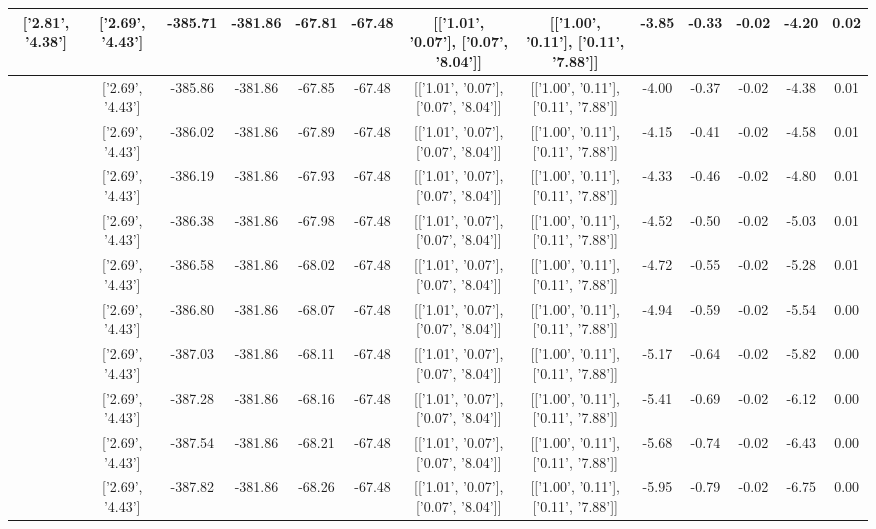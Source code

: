 \begin{table}[htbp]
\begin{adjustbox}{angle=90}
\begin{tabular}{|c|c|c|c|c|c|c|c|c|c|c|c|c|}
 ['2.81', '4.38'] & ['2.69', '4.43'] & -385.71 & -381.86 & -67.81 & -67.48 & [['1.01', '0.07'], ['0.07', '8.04']] & [['1.00', '0.11'], ['0.11', '7.88']] & -3.85 & -0.33 & -0.02 & -4.20 & 0.02\\ \hline
 ['2.82', '4.37'] & ['2.69', '4.43'] & -385.86 & -381.86 & -67.85 & -67.48 & [['1.01', '0.07'], ['0.07', '8.04']] & [['1.00', '0.11'], ['0.11', '7.88']] & -4.00 & -0.37 & -0.02 & -4.38 & 0.01\\ \hline
 ['2.83', '4.36'] & ['2.69', '4.43'] & -386.02 & -381.86 & -67.89 & -67.48 & [['1.01', '0.07'], ['0.07', '8.04']] & [['1.00', '0.11'], ['0.11', '7.88']] & -4.15 & -0.41 & -0.02 & -4.58 & 0.01\\ \hline
 ['2.84', '4.36'] & ['2.69', '4.43'] & -386.19 & -381.86 & -67.93 & -67.48 & [['1.01', '0.07'], ['0.07', '8.04']] & [['1.00', '0.11'], ['0.11', '7.88']] & -4.33 & -0.46 & -0.02 & -4.80 & 0.01\\ \hline
 ['2.86', '4.35'] & ['2.69', '4.43'] & -386.38 & -381.86 & -67.98 & -67.48 & [['1.01', '0.07'], ['0.07', '8.04']] & [['1.00', '0.11'], ['0.11', '7.88']] & -4.52 & -0.50 & -0.02 & -5.03 & 0.01\\ \hline
 ['2.87', '4.35'] & ['2.69', '4.43'] & -386.58 & -381.86 & -68.02 & -67.48 & [['1.01', '0.07'], ['0.07', '8.04']] & [['1.00', '0.11'], ['0.11', '7.88']] & -4.72 & -0.55 & -0.02 & -5.28 & 0.01\\ \hline
 ['2.88', '4.34'] & ['2.69', '4.43'] & -386.80 & -381.86 & -68.07 & -67.48 & [['1.01', '0.07'], ['0.07', '8.04']] & [['1.00', '0.11'], ['0.11', '7.88']] & -4.94 & -0.59 & -0.02 & -5.54 & 0.00\\ \hline
 ['2.90', '4.33'] & ['2.69', '4.43'] & -387.03 & -381.86 & -68.11 & -67.48 & [['1.01', '0.07'], ['0.07', '8.04']] & [['1.00', '0.11'], ['0.11', '7.88']] & -5.17 & -0.64 & -0.02 & -5.82 & 0.00\\ \hline
 ['2.91', '4.33'] & ['2.69', '4.43'] & -387.28 & -381.86 & -68.16 & -67.48 & [['1.01', '0.07'], ['0.07', '8.04']] & [['1.00', '0.11'], ['0.11', '7.88']] & -5.41 & -0.69 & -0.02 & -6.12 & 0.00\\ \hline
 ['2.92', '4.32'] & ['2.69', '4.43'] & -387.54 & -381.86 & -68.21 & -67.48 & [['1.01', '0.07'], ['0.07', '8.04']] & [['1.00', '0.11'], ['0.11', '7.88']] & -5.68 & -0.74 & -0.02 & -6.43 & 0.00\\ \hline
 ['2.93', '4.31'] & ['2.69', '4.43'] & -387.82 & -381.86 & -68.26 & -67.48 & [['1.01', '0.07'], ['0.07', '8.04']] & [['1.00', '0.11'], ['0.11', '7.88']] & -5.95 & -0.79 & -0.02 & -6.75 & 0.00\\ \hline

\end{tabular}
\end{adjustbox}
\end{table}
